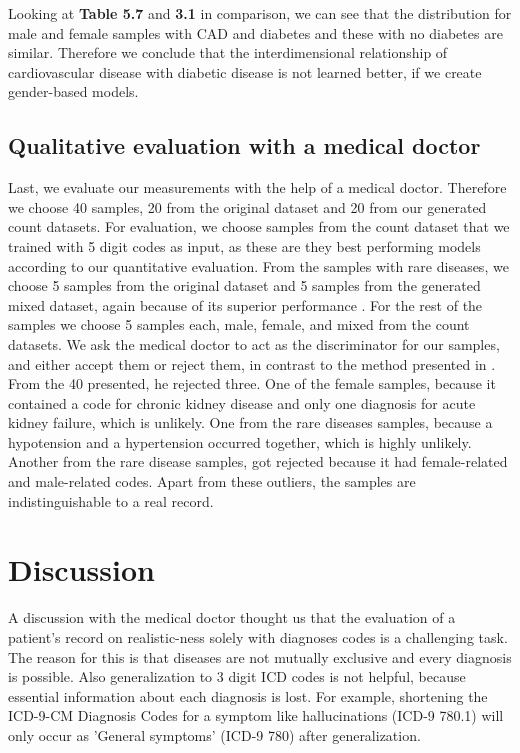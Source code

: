 \documentclass[11pt, a4paper, oneside]{book}
\begin{document}
Looking at \textbf{Table 5.7} and \textbf{3.1} in comparison, we can see that the distribution for male and female samples with CAD and diabetes and these with no diabetes are similar. Therefore we conclude that the interdimensional relationship of cardiovascular disease with diabetic disease is not learned better, if we create gender-based models.

\subsection{Qualitative evaluation with a medical doctor}
Last, we evaluate our measurements with the help of a medical doctor. Therefore we choose 40 samples, 20 from the original dataset and 20 from our generated count datasets. For evaluation, we choose samples from the count dataset that we trained with 5 digit codes as input, as these are they best performing models according to our quantitative evaluation. From the samples with rare diseases, we choose 5 samples from the original dataset and 5 samples from the generated mixed dataset, again because of its superior performance . For the rest of the samples we choose 5 samples each, male, female, and mixed from the count datasets.
We ask the medical doctor to act as the discriminator for our samples, and either accept them or reject them, in contrast to the method presented  in \citep{Choi2017}. From the 40 presented, he rejected three.
One of the female samples, because it contained a code for chronic kidney disease and only one diagnosis for acute kidney failure, which is unlikely. One from the rare diseases samples, because a hypotension and a hypertension occurred together, which is highly unlikely. Another from the rare disease samples, got rejected because it had female-related and male-related codes.
Apart from these outliers, the samples are indistinguishable to a real record.


\section{Discussion}
A discussion with the medical doctor thought us that the evaluation of a patient's record on realistic-ness solely with diagnoses codes is a challenging task. The reason for this is that diseases are not mutually exclusive and every diagnosis is possible. Also generalization to 3 digit ICD codes is not helpful, because essential information about each diagnosis is lost. For example, shortening the ICD-9-CM Diagnosis Codes for a symptom like hallucinations (ICD-9 780.1) will only occur as 'General symptoms' (ICD-9 780) after generalization. 
\end{document}
